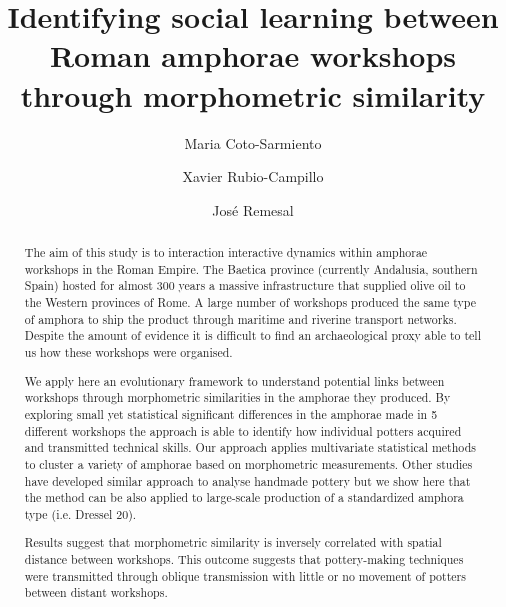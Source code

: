 \documentclass[review]{elsarticle}
\begin{document}
\begin{frontmatter}

\title{Identifying social learning between Roman amphorae workshops through morphometric similarity}


\author[bscadress,ceipacadress]{Maria Coto-Sarmiento}


\author[edadress]{Xavier Rubio-Campillo}
\author[ceipacadress]{Jos\'e Remesal}


\address[bscadress]{Barcelona Supercomputing Center (BSC), Jordi Girona 29, Office 3A, Nexus II Building, 08034, Barcelona, Spain}
\address[edadress]{School of History, Classic \& Archaeology, Room OOM.33, William Robertson Wing, Old Medical School, Teviot Place, University of Edinburgh, UK}
\address[ceipacadress]{CEIPAC, Department of Prehistory and Archaeology, Montalegre, 6-8, 08001, University of Barcelona, Barcelona, Spain}

\begin{abstract}

The aim of this study is to interaction interactive dynamics within amphorae workshops in the Roman Empire. The Baetica province (currently Andalusia, southern Spain) hosted for almost 300 years a massive infrastructure that supplied olive oil to the Western provinces of Rome. A large number of workshops produced the same type of amphora to ship the product through maritime and riverine transport networks. Despite the amount of evidence it is difficult to find an archaeological proxy able to tell us how these workshops were organised.

We apply here an evolutionary framework to understand potential links between workshops through morphometric similarities in the amphorae they produced. By exploring small yet statistical significant differences in the amphorae made in 5 different workshops the approach is able to identify how individual potters acquired and transmitted technical skills.  Our approach applies multivariate statistical methods to cluster a variety of amphorae based on morphometric measurements. Other studies have developed similar approach to analyse handmade pottery but we show here that the method can be also applied to large-scale production of a standardized amphora type (i.e. Dressel 20).

Results suggest that morphometric similarity is inversely correlated with spatial distance between workshops. This outcome suggests that pottery-making techniques were transmitted through oblique transmission with little or no movement of potters between distant workshops.


\end{abstract}
\end{frontmatter}
\end{document}
